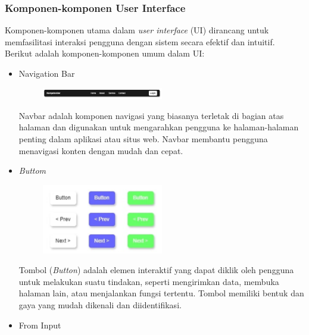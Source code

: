 \documentclass[12pt]{article}
\begin{document}
\subsubsection{Komponen-komponen User Interface}

Komponen-komponen utama dalam \emph{user interface} (UI) dirancang untuk memfasilitasi interaksi pengguna dengan sistem secara efektif dan intuitif. Berikut adalah komponen-komponen umum dalam UI:
\begin{itemize}
    \item Navigation Bar
\begin{figure}[h] %
    \centering
    \includegraphics[width=0.5\textwidth]{asset/navbar.png }
\end{figure}
    \par Navbar adalah komponen navigasi yang biasanya terletak di bagian atas halaman dan digunakan untuk mengarahkan pengguna ke halaman-halaman penting dalam aplikasi atau situs web. Navbar membantu pengguna menavigasi konten dengan mudah dan cepat.

    \item \emph{Buttom}
\begin{figure}[h] %
    \centering
    \includegraphics[width=0.5\textwidth]{asset/button.png }
\end{figure}
    \par Tombol (\emph{Button}) adalah elemen interaktif yang dapat diklik oleh pengguna untuk melakukan suatu tindakan, seperti mengirimkan data, membuka halaman lain, atau menjalankan fungsi tertentu. Tombol memiliki bentuk dan gaya yang mudah dikenali dan diidentifikasi.

    \item From Input 


\end{itemize}
\end{document}
